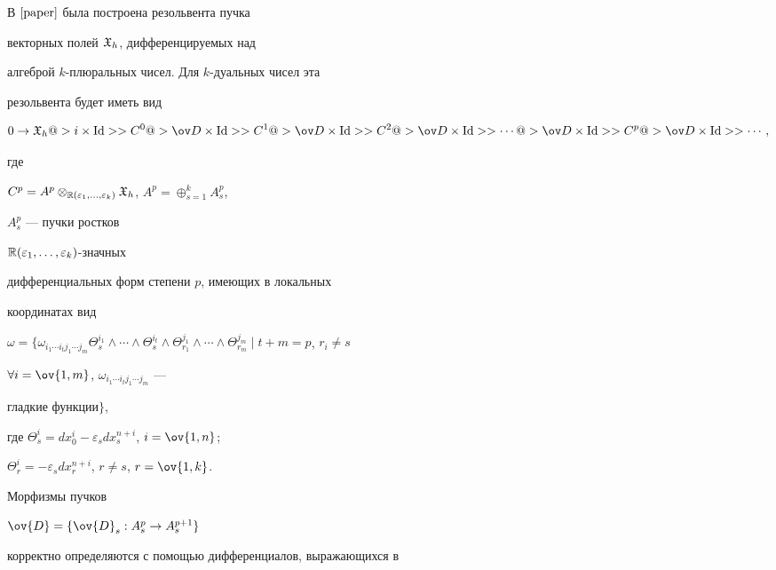 В $\cite{paper}$ была построена резольвента пучка


векторных полей ${\frak X}_{h}$, дифференцируемых над


алгеброй $k$-плюральных чисел. Для $k$-дуальных чисел эта


резольвента будет иметь вид


$$


0 \rightarrow {\frak X}_{h} @>{i \times \Id}>> C^{0}


@>{\ov D\times \Id}>> C^{1}


@>{\ov D\times \Id}>> C^{2}


@>{\ov D \times \Id}>> \dotsb


@>{\ov D \times \Id}>> C^{p}


@>{\ov D \times \Id}>> \dotsb,


$$


где


$C^{p}=A^{p} \otimes_{{\Bbb R}(\varepsilon_1, \dotsc,\varepsilon_k)}


{\frak X}_{h}$, $ A^p=\oplus^k_{s=1}A_s^p$,


$A^{p}_s$ --- пучки ростков


${\Bbb R}(\varepsilon_1, \dotsc, \varepsilon_k)$-значных


дифференциальных форм степени $p$, имеющих в локальных


координатах вид


$\omega=\{\omega_{i_{1} \dotsb


i_{t}j_1\dotsb j_m} \Theta^{i_{1}}_s \wedge \dotsb \wedge


\Theta^{i_{t}}_s \wedge \Theta_{r_1}^{j_1}\wedge \dotsb \wedge


\Theta_{r_m}^{j_m}\mid t+m=p$, $r_i\ne s$


$\forall i=\ov{1,m}$, $\omega_{i_1 \dotsb i_t j_1\dotsb j_m}$ ---


гладкие функции$\}$,


где $\Theta^{i}_s=dx^{i}_0 - \varepsilon_s dx^{n+i}_s$, $i =


\ov{1,n}$;


$\Theta_r^i=-\varepsilon_s dx_r^{n+i}$, $r \ne s$, $r=\ov{1,k}$.





Морфизмы пучков 


$\ov{D}=\{\ov{D}_s: A^{p}_s \rightarrow A^{p+1}_s\}$


корректно определяются с помощью дифференциалов, выражающихся в


